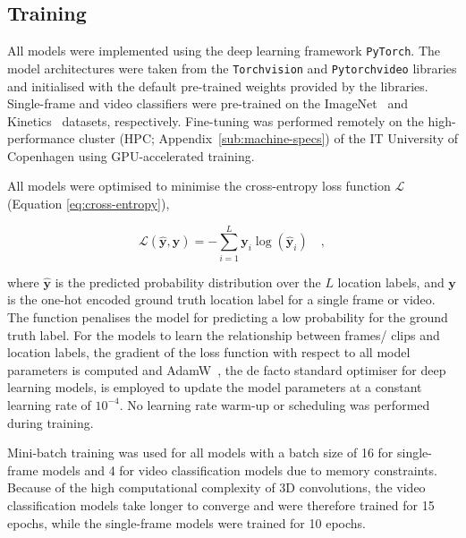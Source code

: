 \documentclass[a4paper]{article}
\begin{document}

\subsection{Training} %
\label{sub:training}

All models were implemented using the deep learning framework \texttt{PyTorch}.
The model architectures were taken from the \texttt{Torchvision} and
\texttt{Pytorchvideo} libraries and initialised with the default pre-trained
weights provided by the libraries. Single-frame and video classifiers were
pre-trained on the ImageNet~\cite{imagenet} and Kinetics~\cite{kinetics}
datasets, respectively. Fine-tuning was performed remotely on the
high-performance cluster (HPC; Appendix~\ref{sub:machine-specs}) of the IT
University of Copenhagen using GPU-accelerated training. 

All models were optimised to minimise the cross-entropy loss function
$\mathcal{L}$ (Equation \ref{eq:cross-entropy}), 

\begin{equation}
  \mathcal{L}(\hat{\mathbf{y}},\mathbf{y}) = -\sum_{i=1}^{L} \mathbf{y}_i
  \log(\hat{\mathbf{y}}_i) \quad ,
  \label{eq:cross-entropy}
\end{equation}




where $\hat{\mathbf{y}}$ is the predicted probability distribution over the $L$
location labels, and $\mathbf{y}$ is the one-hot encoded ground truth location
label for a single frame or video. The function penalises the model for
predicting a low probability for the ground truth label. For the models to learn
the relationship between frames/ clips and location labels, the gradient of the
loss function with respect to all model parameters is computed and
AdamW~\cite{adamw}, the de facto standard optimiser for deep learning models, is
employed to update the model parameters at a constant learning rate of
$10^{-4}$. No learning rate warm-up or scheduling was performed during training.

Mini-batch training was used for all models with a batch size of 16 for
single-frame models and 4 for video classification models due to memory
constraints. Because of the high computational complexity of 3D convolutions,
the video classification models take longer to converge and were therefore
trained for 15 epochs, while the single-frame models were trained for 10 epochs.
\end{document}
